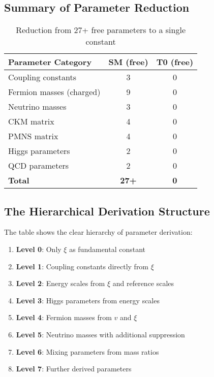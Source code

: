 \documentclass[12pt,a4paper]{article}
\begin{document}
\subsection{Summary of Parameter Reduction}
\label{subsec:reduction_summary}

\begin{table}[h]
	\centering
	\begin{tabular}{lcc}
		\toprule
		\textbf{Parameter Category} & \textbf{SM (free)} & \textbf{T0 (free)} \\
		\midrule
		Coupling constants & 3 & 0 \\
		Fermion masses (charged) & 9 & 0 \\
		Neutrino masses & 3 & 0 \\
		CKM matrix & 4 & 0 \\
		PMNS matrix & 4 & 0 \\
		Higgs parameters & 2 & 0 \\
		QCD parameters & 2 & 0 \\
		\midrule
		\textbf{Total} & \textbf{27+} & \textbf{0} \\
		\bottomrule
	\end{tabular}
	\caption{Reduction from 27+ free parameters to a single constant}
\end{table}

\subsection{The Hierarchical Derivation Structure}
\label{subsec:hierarchical_structure}

The table shows the clear hierarchy of parameter derivation:

\begin{enumerate}
	\item \textbf{Level 0}: Only $\xi$ as fundamental constant
	\item \textbf{Level 1}: Coupling constants directly from $\xi$
	\item \textbf{Level 2}: Energy scales from $\xi$ and reference scales
	\item \textbf{Level 3}: Higgs parameters from energy scales
	\item \textbf{Level 4}: Fermion masses from $v$ and $\xi$
	\item \textbf{Level 5}: Neutrino masses with additional suppression
	\item \textbf{Level 6}: Mixing parameters from mass ratios
	\item \textbf{Level 7}: Further derived parameters
\end{enumerate}
\end{document}
